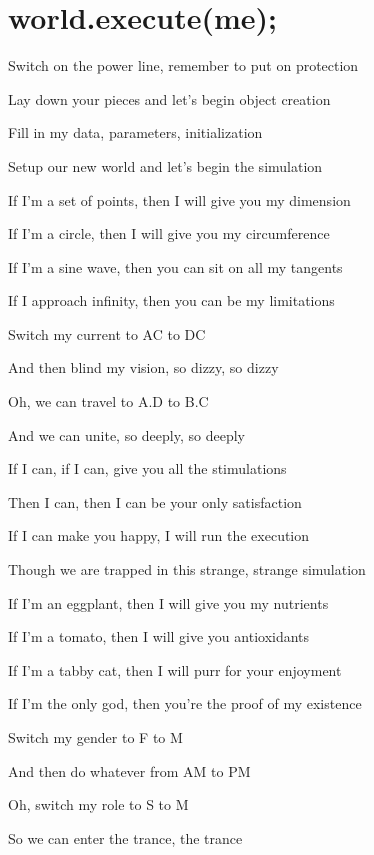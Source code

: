 \section{world.execute(me);}

Switch on the power line, remember to put on protection

Lay down your pieces and let's begin object creation

Fill in my data, parameters, initialization

Setup our new world and let's begin the simulation

\bigskip

If I'm a set of points, then I will give you my dimension

If I'm a circle, then I will give you my circumference

If I'm a sine wave, then you can sit on all my tangents

If I approach infinity, then you can be my limitations

\bigskip

Switch my current to AC to DC

And then blind my vision, so dizzy, so dizzy

Oh, we can travel to A.D to B.C

And we can unite, so deeply, so deeply

\bigskip

If I can, if I can, give you all the stimulations

Then I can, then I can be your only satisfaction

If I can make you happy, I will run the execution

Though we are trapped in this strange, strange simulation

\bigskip

If I'm an eggplant, then I will give you my nutrients

If I'm a tomato, then I will give you antioxidants

If I'm a tabby cat, then I will purr for your enjoyment

If I'm the only god, then you're the proof of my existence

\bigskip

Switch my gender to F to M

And then do whatever from AM to PM

Oh, switch my role to S to M

So we can enter the trance, the trance

\bigskip

